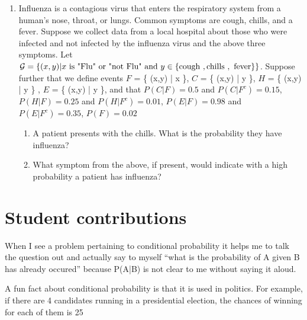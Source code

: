 \begin{enumerate}
   \item Influenza is a contagious virus that enters the respiratory system from a human's nose, throat, or lungs. Common symptoms are cough, chills, and a fever.
   Suppose we collect data from a local hospital about those who were infected and not infected by the influenza virus and the above three symptoms. Let $\mathcal{G} = \{ (x,y)  | x \text{ is } \text{"Flu"} \text{ or } \text{"not Flu"} \text{ and } y \in \{ \text{cough },\text{chills },\text{ fever} \}   \}$. 
   Suppose further that we define events $F$ = \{ (x,y)  | x   \}, $C$ = \{ (x,y)  | y   \}, $H$ = \{ (x,y)  | y   \} , $E$ = \{ (x,y)  | y   \}, and that $P( C|F ) = 0.5$ and $P( C|F^{c} ) = 0.15$, $P( H|F ) = 0.25$ and $P( H|F^{c} ) = 0.01$, $P( E|F ) = 0.98$ and $P( E|F^{c} ) = 0.35$, $P(F) = 0.02$  
    \begin{enumerate}
       \item A patient presents with the chills. What is the probability they have influenza? 
       \item What symptom from the above, if present, would indicate with a high probability a patient has influenza?
    \end{enumerate}
    
\end{enumerate}

\section{Student contributions}


 When I see a problem pertaining to conditional probability it helps me to talk the question out and actually say to myself “what is the probability of A given B has already occured” because P(A|B) is not clear to me without saying it aloud.

 A fun fact about conditional probability is that it is used in politics. For example, if there are 4 candidates running in a presidential election, the chances of winning for each of them is 25%



